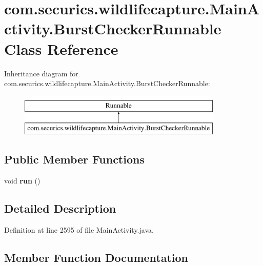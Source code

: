 \section{com.\+securics.\+wildlifecapture.\+Main\+Activity.\+Burst\+Checker\+Runnable Class Reference}
\label{classcom_1_1securics_1_1wildlifecapture_1_1_main_activity_1_1_burst_checker_runnable}
Inheritance diagram for com.\+securics.\+wildlifecapture.\+Main\+Activity.\+Burst\+Checker\+Runnable\+:\begin{figure}[H]
\begin{center}
\leavevmode
\includegraphics[height=2.000000cm]{classcom_1_1securics_1_1wildlifecapture_1_1_main_activity_1_1_burst_checker_runnable}
\end{center}
\end{figure}
\subsection*{Public Member Functions}
\begin{DoxyCompactItemize}
\item 
void {\bf run} ()
\end{DoxyCompactItemize}


\subsection{Detailed Description}


Definition at line 2595 of file Main\+Activity.\+java.



\subsection{Member Function Documentation}
